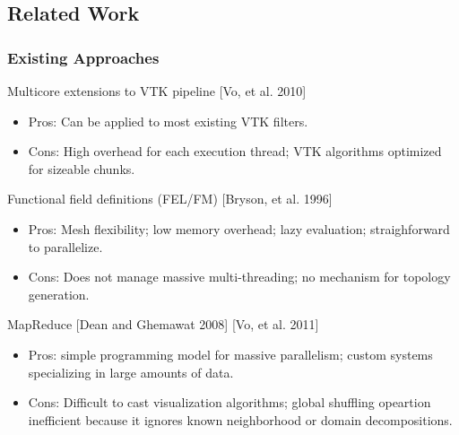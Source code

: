 \documentclass[brown]{beamer}
\begin{document}
\subsection{Related Work}
\frame
{
  \frametitle{Existing Approaches}
  Multicore extensions to VTK pipeline [Vo, et al. 2010]
  \begin{itemize}
  \item Pros: Can be applied to most existing VTK filters.
  \item Cons: High overhead for each execution thread; VTK algorithms
    optimized for sizeable chunks.
  \end{itemize}
  Functional field definitions (FEL/FM) [Bryson, et al. 1996]
  \begin{itemize}
  \item Pros: Mesh flexibility; low memory overhead; lazy evaluation;
    straighforward to parallelize.
  \item Cons: Does not manage massive multi-threading; no mechanism for
    topology generation.
  \end{itemize}
  MapReduce [Dean and Ghemawat 2008] [Vo, et al. 2011]
  \begin{itemize}
  \item Pros: simple programming model for massive parallelism; custom
    systems specializing in large amounts of data.
  \item Cons: Difficult to cast visualization algorithms; global shuffling
    opeartion inefficient because it ignores known neighborhood or domain
    decompositions.
  \end{itemize}
}
\end{document}
